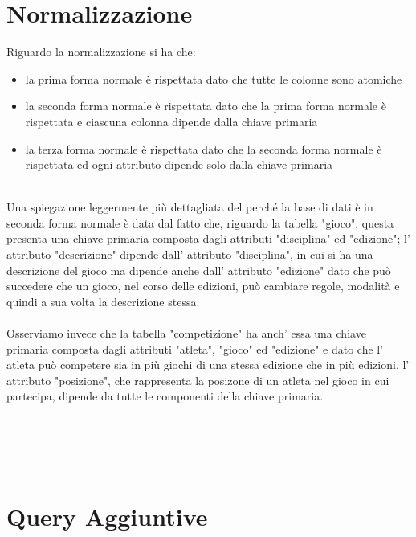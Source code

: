 \documentclass[paper=a4, fontsize=12 pt]{scrartcl} %
\begin{document}
	
	\section{Normalizzazione}
	
	Riguardo la normalizzazione si ha che:
	\begin{itemize}
		\item la prima forma normale è rispettata dato che tutte le colonne sono atomiche
		\item la seconda forma normale è rispettata dato che la prima forma normale è rispettata e ciascuna colonna dipende dalla chiave primaria
		\item la terza forma normale è rispettata dato che la seconda forma normale è rispettata ed ogni attributo dipende solo dalla chiave primaria\\\\
	\end{itemize}
	
	Una spiegazione leggermente più dettagliata del perché la base di dati è in seconda forma normale è data dal fatto che, riguardo la tabella "gioco", questa presenta una chiave primaria composta dagli attributi "disciplina" ed "edizione"; l' attributo "descrizione" dipende dall' attributo "disciplina", in cui si ha una descrizione del gioco ma dipende anche dall' attributo "edizione" dato che può succedere che un gioco, nel corso delle edizioni, può cambiare regole, modalità e quindi a sua volta la descrizione stessa.\\\\
	Osserviamo invece che la tabella "competizione" ha anch' essa una chiave primaria composta dagli attributi "atleta", "gioco" ed "edizione" e dato che l' atleta può competere sia in più giochi di una stessa edizione che in più edizioni, l' attributo "posizione", che rappresenta la posizone di un atleta nel gioco in cui partecipa, dipende da tutte le componenti della chiave primaria.
	
	\newpage
	
	\lstset{language=SQL}
	\begin{lstlisting}
		
		
		
		
	\end{lstlisting}
	
	\newpage
	
	\section{Query Aggiuntive}
	
\end{document}
